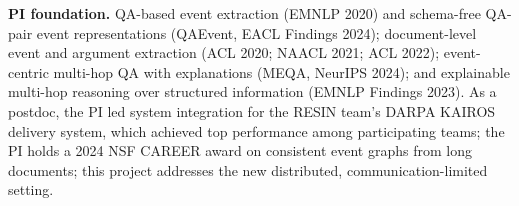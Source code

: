 \documentclass[11pt]{article}
\newcommand{\head}[1]{{\color{navy}\textbf{#1}}\enspace}
\begin{document}
\head{PI foundation.} QA-based event extraction (EMNLP 2020) and schema-free QA-pair event representations (QAEvent, EACL Findings 2024); document-level event and argument extraction (ACL 2020; NAACL 2021; ACL 2022); event-centric multi-hop QA with explanations (MEQA, NeurIPS 2024); and explainable multi-hop reasoning over structured information (EMNLP Findings 2023). As a postdoc, the PI led system integration for the RESIN team's DARPA KAIROS delivery system, which achieved top performance among participating teams; the PI holds a 2024 NSF CAREER award on consistent event graphs from long documents; this project addresses the new distributed, communication-limited setting.
\end{document}
